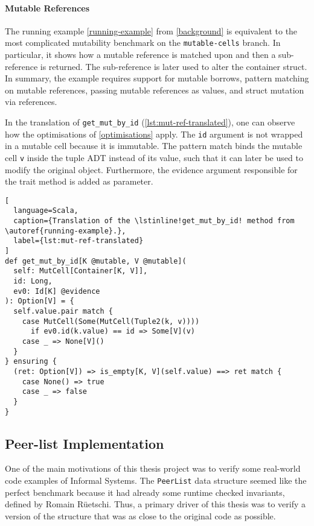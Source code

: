 \paragraph{Mutable References}

The running example \autoref{running-example} from \autoref{background} is
equivalent to the most complicated mutability benchmark on the
\texttt{mutable-cells} branch. In particular, it shows how a mutable reference
is matched upon and then a sub-reference is returned. The sub-reference is later
used to alter the container struct. In summary, the example requires support for
mutable borrows, pattern matching on mutable references, passing mutable
references as values, and struct mutation via references.

In the translation of \lstinline!get_mut_by_id!
(\autoref{lst:mut-ref-translated}), one can observe how the optimisations of
\autoref{optimisations} apply. The \lstinline!id! argument is not wrapped in a
mutable cell because it is immutable. The pattern match binds the mutable cell
\lstinline!v! inside the tuple ADT instead of its value, such that it can later
be used to modify the original object. Furthermore, the evidence argument
responsible for the trait method is added as parameter.

\begin{lstlisting}[
  language=Scala,
  caption={Translation of the \lstinline!get_mut_by_id! method from \autoref{running-example}.},
  label={lst:mut-ref-translated}
]
def get_mut_by_id[K @mutable, V @mutable](
  self: MutCell[Container[K, V]],
  id: Long,
  ev0: Id[K] @evidence
): Option[V] = {
  self.value.pair match {
    case MutCell(Some(MutCell(Tuple2(k, v))))
      if ev0.id(k.value) == id => Some[V](v)
    case _ => None[V]()
  }
} ensuring {
  (ret: Option[V]) => is_empty[K, V](self.value) ==> ret match {
    case None() => true
    case _ => false
  }
}
\end{lstlisting}

\subsection{Peer-list Implementation}
\label{peerlist}

One of the main motivations of this thesis project was to verify some real-world
code examples of Informal Systems. The \lstinline!PeerList! data structure
seemed like the perfect benchmark because it had already some runtime checked
invariants, defined by Romain Rüetschi. Thus, a primary driver of this thesis
was  to verify a version of the structure that was as close to the original code
as possible.

